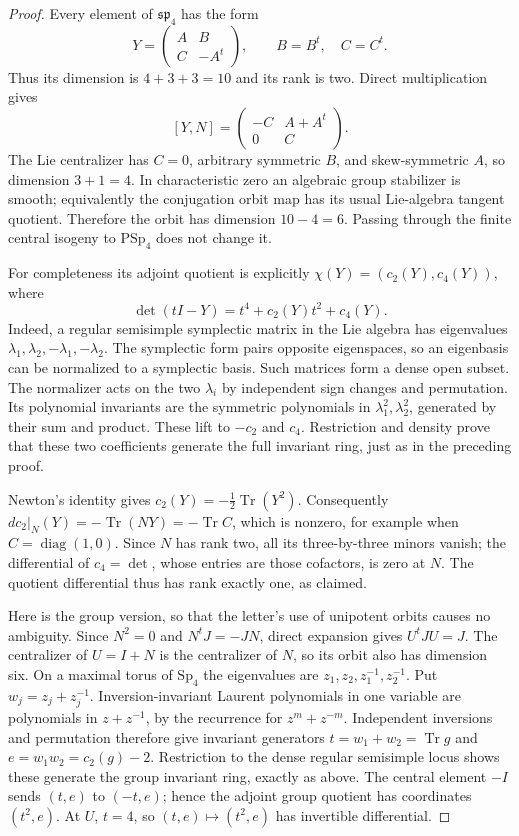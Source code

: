 \documentclass[11pt,a4paper]{article}
\theoremstyle{definition}\newtheorem{definition}[theorem]{Definition}
\theoremstyle{remark}\newtheorem{remark}[theorem]{Remark}
\begin{document}
\begin{proof}
Every element of \(\mathfrak{sp}_4\) has the form
\[
 Y=\begin{pmatrix}A&B\\C&-A^t\end{pmatrix},
 \qquad B=B^t,\quad C=C^t.
\]
Thus its dimension is \(4+3+3=10\) and its rank is two.
Direct multiplication gives
\[
 [Y,N]=\begin{pmatrix}-C&A+A^t\\0&C\end{pmatrix}.
\]
The Lie centralizer has \(C=0\), arbitrary symmetric
\(B\), and skew-symmetric \(A\), so dimension \(3+1=4\).
In characteristic zero an algebraic group stabilizer is
smooth; equivalently the conjugation orbit map has its
usual Lie-algebra tangent quotient. Therefore the orbit
has dimension \(10-4=6\). Passing through the finite
central isogeny to \(\mathrm{PSp}_4\) does not change it.

For completeness its adjoint quotient is explicitly
\(\chi(Y)=(c_2(Y),c_4(Y))\), where
\[
 \det(tI-Y)=t^4+c_2(Y)t^2+c_4(Y).
\]
Indeed, a regular semisimple symplectic matrix in the Lie
algebra has eigenvalues \(\lambda_1,\lambda_2,-\lambda_1,
-\lambda_2\). The symplectic form pairs opposite eigenspaces,
so an eigenbasis can be normalized to a symplectic basis.
Such matrices form a dense open subset. The normalizer
acts on the two \(\lambda_i\) by independent sign changes
and permutation. Its polynomial invariants are the
symmetric polynomials in \(\lambda_1^2,\lambda_2^2\),
generated by their sum and product. These lift to
\(-c_2\) and \(c_4\). Restriction and density prove
that these two coefficients generate the full invariant
ring, just as in the preceding proof.

Newton's identity gives \(c_2(Y)=-\tfrac12\operatorname{Tr}(Y^2)\).
Consequently \(dc_2|_N(Y)=-\operatorname{Tr}(NY)=-\operatorname{Tr}C\),
which is nonzero, for example when \(C=\operatorname{diag}(1,0)\).
Since \(N\) has rank two, all its three-by-three minors
vanish; the differential of \(c_4=\det\), whose entries
are those cofactors, is zero at \(N\). The quotient
differential thus has rank exactly one, as claimed.

Here is the group version, so that the letter's use of
unipotent orbits causes no ambiguity. Since \(N^2=0\) and
\(N^tJ=-JN\), direct expansion gives \(U^tJU=J\).
The centralizer of \(U=I+N\) is the centralizer of \(N\),
so its orbit also has dimension six. On a maximal torus
of \(\mathrm{Sp}_4\) the eigenvalues are
\(z_1,z_2,z_1^{-1},z_2^{-1}\). Put \(w_j=z_j+z_j^{-1}\).
Inversion-invariant Laurent polynomials in one variable
are polynomials in \(z+z^{-1}\), by the recurrence for
\(z^m+z^{-m}\). Independent inversions and permutation
therefore give invariant generators
\(t=w_1+w_2=\operatorname{Tr}g\) and
\(e=w_1w_2=c_2(g)-2\). Restriction to the dense regular
semisimple locus shows these generate the group invariant
ring, exactly as above. The central element \(-I\) sends
\((t,e)\) to \((-t,e)\); hence the adjoint group quotient
has coordinates \((t^2,e)\). At \(U\), \(t=4\), so
\((t,e)\mapsto(t^2,e)\) has invertible differential.


\end{proof}
\end{document}
